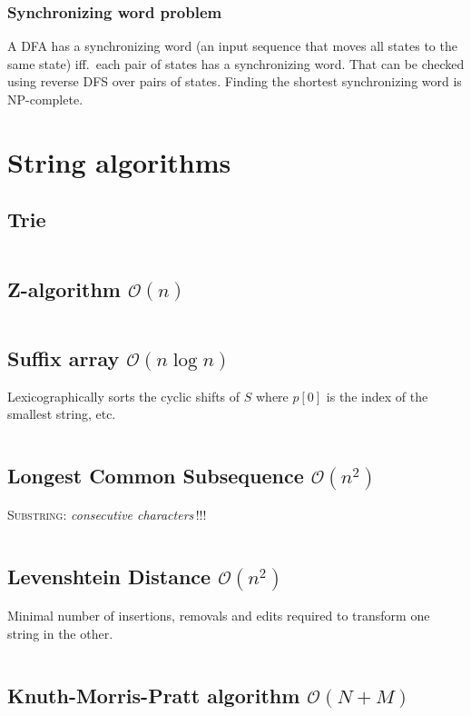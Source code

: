 \documentclass[8pt,a4paper,landscape,oneside]{amsart}
\newcommand{\mintedstyle}[2]{\inputminted[fontsize=\normalsize,baselinestretch=.9,breaklines,breakautoindent,tabsize=2]{#1}{code/#2}}
\newcommand{\code}[1]{\mintedstyle{cpp}{#1}}
\begin{document}
\begin{multicols*}{3}
\subsubsection{Synchronizing word problem}
A DFA has a synchronizing word (an input sequence that moves all states
to the same state) iff.\ each pair of states has a synchronizing word.
That can be checked using reverse DFS over pairs of states. Finding the
shortest synchronizing word is NP-complete.

\vfill\null \columnbreak
\section{String algorithms}
\subsection{Trie}
\code{strings/trie.cpp}

\subsection{Z-algorithm $\mathcal{O}(n)$}
\code{strings/z_function.cpp}

\subsection{Suffix array $\mathcal{O}(n \log{n})$}
Lexicographically sorts the cyclic shifts of $S$ where $p[0]$ is the index of the smallest string, etc.
\code{strings/suffixarray.cpp}

\subsection{Longest Common Subsequence $\mathcal{O}(n^{2})$}
\textsc{Substring}: \textit{consecutive characters}\,!!!
\code{strings/lcs.cpp}

\subsection{Levenshtein Distance $\mathcal{O}(n^{2})$}
Minimal number of insertions, removals and edits required to transform one string in the other.
\code{strings/edit_dist.cpp}

\subsection{Knuth-Morris-Pratt algorithm $\mathcal{O}(N + M)$}
\code{strings/kmp.cpp}


\end{multicols*}
\end{document}
